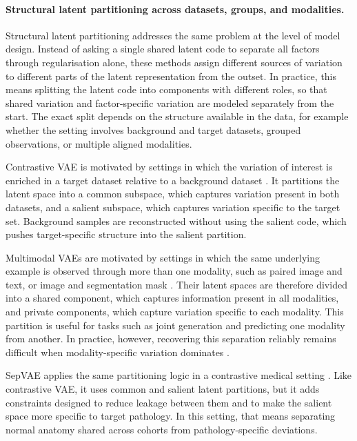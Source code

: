 \paragraph{Structural latent partitioning across datasets, groups, and modalities.}
Structural latent partitioning addresses the same problem at the level of model design. 
Instead of asking a single shared latent code to separate all factors through regularisation alone, these methods assign different sources of variation to different parts of the latent representation from the outset. 
In practice, this means splitting the latent code into components with different roles, so that shared variation and factor-specific variation are modeled separately from the start. 
The exact split depends on the structure available in the data, for example whether the setting involves background and target datasets, grouped observations, or multiple aligned modalities.

Contrastive VAE is motivated by settings in which the variation of interest is enriched in
a target dataset relative to a background dataset \citep{abid2019cvae}. It partitions the
latent space into a common subspace, which captures variation present in both datasets, and
a salient subspace, which captures variation specific to the target set. Background
samples are reconstructed without using the salient code, which pushes target-specific
structure into the salient partition.

Multimodal VAEs are motivated by settings in which the same underlying example is observed through more than one modality, such as paired image and text, or image and segmentation mask \citep{hsu2018pvae, shi2019mmvae}. 
Their latent spaces are therefore divided into a shared component, which captures information present in all modalities, and private components, which capture variation specific to each modality. 
This partition is useful for tasks such as joint generation and predicting one modality from another. 
In practice, however, recovering this separation reliably remains difficult when modality-specific variation dominates \citep{martens2024sharedprivate}.

SepVAE applies the same partitioning logic in a contrastive medical setting \citep{louiset2024sepvae}. 
Like contrastive VAE, it uses common and salient latent partitions, but it adds constraints designed to reduce leakage between them and to make the salient space more specific to target pathology. 
In this setting, that means separating normal anatomy shared across cohorts from pathology-specific deviations.
